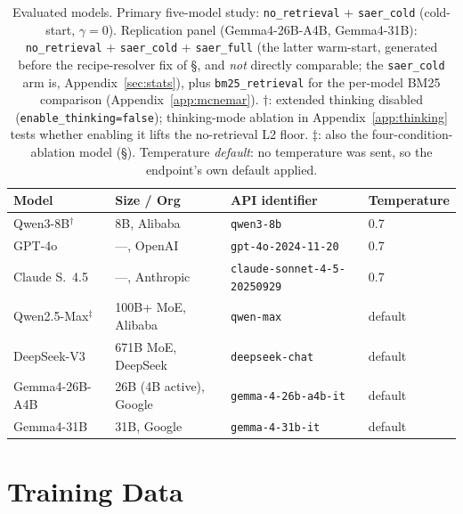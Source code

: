 \documentclass[letterpaper]{article} %
\newcommand{\appref}[1]{Appendix~\ref{#1}}
\newcommand{\bodyref}[1]{\getrefnumber{#1}}
\begin{document}
\begin{table}[htbp]
\caption{Evaluated models.  Primary five-model study: \texttt{no\_retrieval}
+ \texttt{saer\_cold} (cold-start, $\gamma{=}0$).  Replication panel
(Gemma4-26B-A4B, Gemma4-31B): \texttt{no\_retrieval} +
\texttt{saer\_cold} + \texttt{saer\_full} (the latter warm-start, generated
before the recipe-resolver fix of \S\bodyref{sec:protocol}, and \emph{not} directly
comparable; the \texttt{saer\_cold} arm is, \appref{sec:stats}), plus \texttt{bm25\_retrieval}
for the per-model BM25 comparison (\appref{app:mcnemar}).
$\dagger$: extended thinking disabled
(\texttt{enable\_thinking=false}); thinking-mode ablation in \appref{app:thinking} tests whether enabling it lifts the no-retrieval L2 floor.
$\ddagger$: also the four-condition-ablation model (\S\bodyref{sec:ablation}).
Temperature \emph{default}: no temperature was sent, so the endpoint's own default applied.}
\label{tab:models}
\footnotesize\renewcommand{\arraystretch}{1.1}\setlength{\tabcolsep}{4pt}
\centering
\begin{tabular}{llll}
\toprule
Model & Size / Org & API identifier & Temperature \\
\midrule
Qwen3-8B$^\dagger$~\citep{qwen2025qwen3}      & 8B, Alibaba     & \texttt{qwen3-8b} & 0.7 \\
GPT-4o~\citep{openai2024gpt4o}                & ---, OpenAI            & \texttt{gpt-4o-2024-11-20} & 0.7 \\
Claude S.~4.5~\citep{anthropic2025claude}     & ---, Anthropic         & \texttt{claude-sonnet-4-5-20250929} & 0.7 \\
Qwen2.5-Max$^\ddagger$~\citep{yang2024qwen25} & 100B+ MoE, Alibaba     & \texttt{qwen-max} & default \\
DeepSeek-V3~\citep{deepseek2024v3}            & 671B MoE, DeepSeek     & \texttt{deepseek-chat} & default \\
\midrule
Gemma4-26B-A4B~\citep{gemmateam2026gemma4}    & 26B (4B active), Google & \texttt{gemma-4-26b-a4b-it} & default \\
Gemma4-31B~\citep{gemmateam2026gemma4}        & 31B, Google            & \texttt{gemma-4-31b-it} & default \\
\bottomrule
\end{tabular}
\renewcommand{\arraystretch}{1}
\end{table}

\section{Training Data}
\label{app:traindata}
\end{document}
